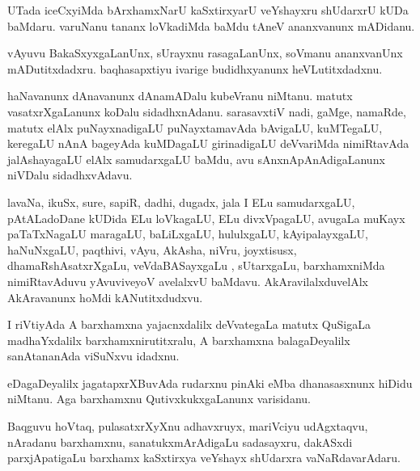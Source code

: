 \documentclass{article}
\begin{document}
\begin{mn}
UTada iceCxyiMda bArxhamxNarU  kaSxtirxyarU veYshayxru shUdarxrU kUDa baMdaru.  
varuNanu  tananx  loVkadiMda  baMdu  tAneV  ananxvanunx mADidanu.
\end{mn}

\begin{mn}
vAyuvu  BakaSxyxgaLanUnx,  sUrayxnu rasagaLanUnx,  soVmanu ananxvanUnx mADutitxdadxru.  
baqhasapxtiyu ivarige budidhxyanunx heVLutitxdadxnu.
\end{mn}

\begin{mn}
haNavanunx dAnavanunx dAnamADalu  kubeVranu niMtanu.  matutx vasatxrXgaLanunx  koDalu  
sidadhxnAdanu.  sarasavxtiV  nadi, gaMge, namaRde, matutx elAlx puNayxnadigaLU  
puNayxtamavAda  bAvigaLU, kuMTegaLU, keregaLU  nAnA bageyAda  kuMDagaLU  girinadigaLU  deVvariMda  
nimiRtavAda  jalAshayagaLU elAlx samudarxgaLU baMdu, avu sAnxnApAnAdigaLanunx niVDalu  sidadhxvAdavu.
\end{mn}

\begin{mn}
lavaNa,  ikuSx,  sure,  sapiR,  dadhi,  dugadx,  jala  I  ELu samudarxgaLU,  
pAtALadoDane  kUDida  ELu  loVkagaLU,  ELu divxVpagaLU,  avugaLa  muKayx paTaTxNagaLU  
maragaLU,  baLiLxgaLU,  hululxgaLU,  kAyipalayxgaLU,  haNuNxgaLU,  paqthivi,  vAyu,  
AkAsha,  niVru,  joyxtisusx,  dhamaRshAsatxrXgaLu,  veVdaBASayxgaLu ,  sUtarxgaLu,  
barxhamxniMda nimiRtavAduvu  yAvuviveyoV  avelalxvU baMdavu.   AkAravilalxduvelAlx  
AkAravanunx  hoMdi kANutitxdudxvu.
\end{mn}

\begin{mn}
I riVtiyAda  A barxhamxna yajacnxdalilx  deVvategaLa  matutx  QuSigaLa  madhaYxdalilx  
barxhamxnirutitxralu,  A barxhamxna  balagaDeyalilx  sanAtananAda  viSuNxvu  idadxnu.
\end{mn}

\begin{mn}
eDagaDeyalilx jagatapxrXBuvAda rudarxnu pinAki eMba dhanasasxnunx hiDidu niMtanu.  
Aga barxhamxnu QutivxkukxgaLanunx varisidanu.
\end{mn}

\begin{mn}
Baqguvu hoVtaq,  pulasatxrXyXnu adhavxruyx, mariVciyu udAgxtaqvu,  
nAradanu  barxhamxnu,  sanatukxmArAdigaLu sadasayxru,  dakASxdi 
parxjApatigaLu barxhamx kaSxtirxya veYshayx shUdarxra vaNaRdavarAdaru.
\end{mn}
\end{document}

